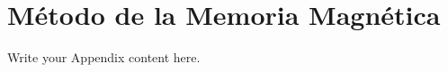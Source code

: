 
\chapter{Método de la Memoria Magnética} %

\label{ApendiceMMM} %

Write your Appendix content here.
